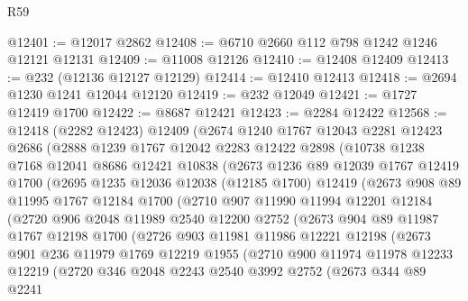 \begin{lexlean}{R59}
\begin{coremodule}
@12401 := @12017 @2862
@12408 := @6710 @2660 @112 @798 @1242 @1246 @12121 @12131
@12409 := @11008 @12126
@12410 := @12408 @12409
@12413 := @232 (@12136 @12127 @12129)
@12414 := @12410 @12413
@12418 := @2694 @1230 @1241 @12044 @12120
@12419 := @232 @12049
@12421 := @1727 @12419 @1700
@12422 := @8687 @12421
@12423 := @2284 @12422
@12568 := @12418
    (@2282 @12423)
    @12409
    (@2674
      @1240
      @1767
      @12043
      @2281
      @12423
      @2686
      (@2888
        @1239
        @1767
        @12042
        @2283
        @12422
        @2898
        (@10738
          @1238
          @7168
          @12041
          @8686
          @12421
          @10838
          (@2673
            @1236
            @89
            @12039
            @1767
            @12419
            @1700
            (@2695
              @1235
              @12036
              @12038
              (@12185 @1700)
              @12419
              (@2673
                @908
                @89
                @11995
                @1767
                @12184
                @1700
                (@2710
                  @907
                  @11990
                  @11994
                  @12201
                  @12184
                  (@2720
                    @906
                    @2048
                    @11989
                    @2540
                    @12200
                    @2752
                    (@2673
                      @904
                      @89
                      @11987
                      @1767
                      @12198
                      @1700
                      (@2726
                        @903
                        @11981
                        @11986
                        @12221
                        @12198
                        (@2673
                          @901
                          @236
                          @11979
                          @1769
                          @12219
                          @1955
                          (@2710
                            @900
                            @11974
                            @11978
                            @12233
                            @12219
                            (@2720
                              @346
                              @2048
                              @2243
                              @2540
                              @3992
                              @2752
                              (@2673
                                @344
                                @89
                                @2241

\end{coremodule}
\end{lexlean}

